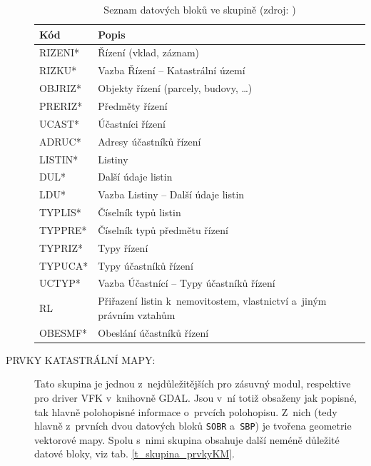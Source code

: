 \documentclass[a4paper,12pt,oneside]{book}
\begin{document}
\begin{description}
\begin{table}[htbp]
\centering
\caption[Seznam datových bloků ve skupině ]{Seznam datových bloků ve skupině  (zdroj: \cite{vfk_struktura})}
\begin{tabular}{ll}
\toprule
\textbf{Kód} & \textbf{Popis} \\ 
\midrule
RIZENI* & Řízení (vklad, záznam) \\ 
RIZKU* & Vazba Řízení -- Katastrální území \\ 
OBJRIZ* & Objekty řízení (parcely, budovy, \dots) \\ 
PRERIZ* & Předměty řízení \\ 
UCAST* & Účastníci řízení \\ 
ADRUC* & Adresy účastníků řízení \\ 
LISTIN* & Listiny \\ 
DUL* & Další údaje listin \\ 
LDU* & Vazba Listiny -- Další údaje listin \\ 
TYPLIS* & Číselník typů listin \\ 
TYPPRE* & Číselník typů předmětu řízení \\ 
TYPRIZ* & Typy řízení \\ 
TYPUCA* & Typy účastníků řízení \\ 
UCTYP* & Vazba Účastnící -- Typy účastníků řízení \\ 
RL & Přiřazení listin k~nemovitostem, vlastnictví a~jiným právním vztahům \\ 
OBESMF* & Obeslání účastníků řízení \\ 
\bottomrule
\end{tabular}
\label{t_skupina_rizeni}
\end{table}
 
 \item[PRVKY KATASTRÁLNÍ MAPY:] Tato skupina je jednou z~nejdůležitějších pro zásuvný modul, respektive pro driver VFK v~knihovně GDAL. Jsou v~ní totiž obsaženy jak popisné, tak hlavně polohopisné informace o~prvcích polohopisu. Z~nich (tedy hlavně z~prvních dvou datových bloků \texttt{SOBR} a~\texttt{SBP}) je tvořena geometrie vektorové mapy. Spolu s~nimi skupina obsahuje další neméně důležité datové bloky, viz tab. \ref{t_skupina_prvkyKM}. \cite{dp_landa}


\end{description}
\end{document}

